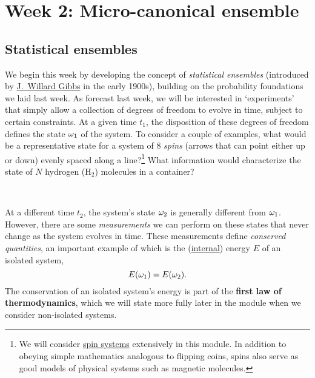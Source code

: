 \renewcommand{\thisweek}{MATH327 Week 2}
\renewcommand{\moddate}{Last modified 4 Feb.~2021}
\setcounter{section}{2}
\setcounter{subsection}{0}
{}
\section*{Week 2: Micro-canonical ensemble}

\subsection{Statistical ensembles}
We begin this week by developing the concept of \textit{statistical ensembles} (introduced by \href{https://en.wikipedia.org/wiki/Josiah_Willard_Gibbs}{J.\ Willard Gibbs} in the early 1900s), building on the probability foundations we laid last week.
As forecast last week, we will be interested in `experiments' that simply allow a collection of degrees of freedom to evolve in time, subject to certain constraints.
At a given time $t_1$, the disposition of these degrees of freedom defines the state $\omega_1$ of the system.
To consider a couple of examples, what would be a representative state for a system of $8$ \textit{spins} (arrows that can point either up or down) evenly spaced along a line?\footnote{We will consider \href{https://en.wikipedia.org/wiki/Spin_model}{spin systems} extensively in this module.  In addition to obeying simple mathematics analogous to flipping coins, spins also serve as good models of physical systems such as magnetic molecules.}
What information would characterize the state of $N$ hydrogen (H$_2$) molecules in a container?
\begin{mdframed}
  \ \\[100 pt]
\end{mdframed}

At a different time $t_2$, the system's state $\omega_2$ is generally different from $\omega_1$.
However, there are some \textit{measurements} we can perform on these states that never change as the system evolves in time.
These measurements define \textit{conserved quantities}, an important example of which is the (\href{https://en.wikipedia.org/wiki/Internal_energy}{internal}) energy $E$ of an isolated system,
\begin{equation*}
  E(\omega_1) = E(\omega_2).
\end{equation*}
The conservation of an isolated system's energy is part of the \textbf{first law of thermodynamics}, which we will state more fully later in the module when we consider non-isolated systems.

